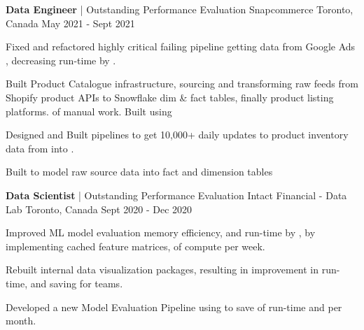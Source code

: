 
\begin{cventries}
\cventry
    {\textbf{Data Engineer} | Outstanding Performance Evaluation} %
    {Snapcommerce} %
    {Toronto, Canada} %
    {May 2021 - Sept 2021} %
    {
      \begin{cvitems} %
        \item {Fixed and refactored highly critical failing  pipeline getting data from Google Ads , decreasing run-time by .}
        \item {Built Product Catalogue infrastructure, sourcing and transforming raw feeds from Shopify product APIs to Snowflake dim \& fact tables, finally product listing platforms.  of manual work. Built using }
        \item {Designed and Built  pipelines to get 10,000+ daily updates to product inventory data from  into .}
        \item {Built   to model raw source data into fact and dimension tables}
      \end{cvitems}
    }
  \cventry
    {\textbf{Data Scientist} | Outstanding Performance Evaluation} %
    {Intact Financial - Data Lab} %
    {Toronto, Canada} %
    {Sept 2020 - Dec 2020} %
    {
      \begin{cvitems} %
        \item {Improved ML model evaluation memory efficiency, and run-time by , by implementing cached feature matrices,  of compute per week.}
        \item {Rebuilt internal data visualization packages, resulting in  improvement in run-time, and saving  for  teams.}
        \item {Developed a new Model Evaluation Pipeline using  to save  of run-time and  per month.}
      \end{cvitems}
    }


\end{cventries}
